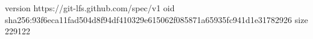 version https://git-lfs.github.com/spec/v1
oid sha256:93f6eca11fad504d8f94df410329e615062f085871a65935fc941d1e31782926
size 229122
